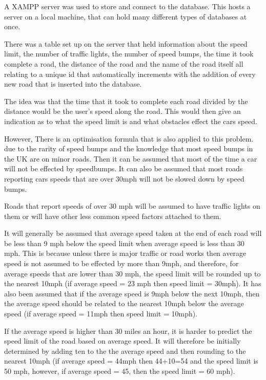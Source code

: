\documentclass[12pt,a4paper]{article}
\begin{document}
A XAMPP server was used to store and connect to the database. This hosts a server on a local machine, that can hold many different types of databases at once.

There was a table set up on the server that held information about the speed limit, the number of traffic lights, the number of speed bumps, the time it took complete a road, the distance of the road and the name of the road itself all relating to a unique id that automatically increments with the addition of every new road that is inserted into the database.

The idea was that the time that it took to complete each road divided by the distance would be the user's speed along the road. This would then give an indication as to what the speed limit is and what obstacles effect the cars speed.

However, There is an optimisation formula that is also applied to this problem. due to the rarity of speed bumps and the knowledge that most speed bumps in the UK are on minor roads. Then it can be assumed that most of the time a car will not be effected by speedbumps. It can also be assumed that most roads reporting cars speeds that are over 30mph will not be slowed down by speed bumps. 

Roads that report speeds of over 30 mph will be assumed to have traffic lights on them or will have other less common speed factors attached to them. 

It will generally be assumed that average speed taken at the end of each road will be less than 9 mph below the speed limit when average speed is less than 30 mph. This is because unless there is major traffic or road works then average speed is not assumed to be effected by more than 9mph, and therefore, for average speeds that are lower than 30 mph, the speed limit will be rounded up to the nearest 10mph (if average speed = 23 mph then speed limit = 30mph). It has also been assumed that if the average speed is 9mph below the next 10mph, then the average speed should be related to the nearest 10mph below the average speed (if average speed = 11mph then speed limit = 10mph).

If the average speed is higher than 30 miles an hour, it is harder to predict the speed limit of the road based on average speed. It will therefore be initially determined by adding ten to the the average speed and then rounding to the nearest 10mph (if average speed = 44mph then 44+10=54 and the speed limit is 50 mph, however, if average speed = 45, then the speed limit = 60 mph). 
\end{document}
